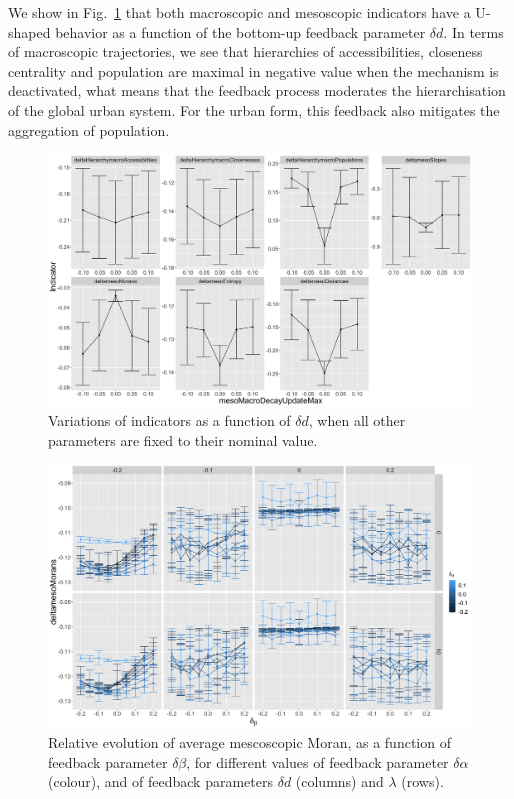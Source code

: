 \documentclass[ijgi,article,submit,moreauthors,pdftex]{Definitions/mdpi}
\begin{document}
We show in Fig.~\ref{fig:fig3} that both macroscopic and mesoscopic indicators have a U-shaped behavior as a function of the bottom-up feedback parameter $\delta d$. In terms of macroscopic trajectories, we see that hierarchies of accessibilities, closeness centrality and population are maximal in negative value when the mechanism is deactivated, what means that the feedback process moderates the hierarchisation of the global urban system. For the urban form, this feedback also mitigates the aggregation of population.




\begin{figure}[H]
	\includegraphics[width=\linewidth]{figures/onefactor_allindics_mesoMacroDecayUpdateMax_errorbars.png}
	\caption{Variations of indicators as a function of $\delta d$, when all other parameters are fixed to their nominal value.\label{fig:fig3}}
\end{figure}

\begin{figure}[H]
	\includegraphics[width=\linewidth]{figures/deltamesoMorans-macroMesoAlphaUpdateMax_colormacroMesoBetaUpdateMax_facetmesoMacroCongestionCost-mesoMacroDecayUpdateMax_mesoBeta0_11.png}
	\caption{Relative evolution of average mescoscopic Moran, as a function of feedback parameter $\delta \beta$, for different values of feedback parameter $\delta \alpha$ (colour), and of feedback parameters $\delta d$ (columns) and $\lambda$ (rows).\label{fig:fig5}}
\end{figure}
\end{document}
